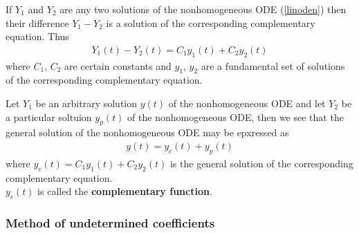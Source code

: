\documentclass{article}
\begin{document}
\begin{theorem}
	If $Y_1$ and $Y_2$ are any two solutions of the nonhomogeneous ODE
	(\ref{linoden}) then their difference $Y_1-Y_2$ is  a solution of the
	corresponding complementary equation. Thus
	\begin{align*}
		Y_1(t) - Y_2(t) = C_1y_1(t) + C_2y_2(t)
	\end{align*}
	where $C_1$, $C_2$ are certain constants and $y_1$, $y_2$ are a
	fundamental set of solutions of the corresponding complementary equation.
\end{theorem}

\begin{theorem}
	Let $Y_1$ be an arbitrary solution $y(t)$ of the nonhomogeneous ODE
	and let $Y_2$ be a particular soltuion $y_p(t)$ of the nonhomogeneous
	ODE, then we see that the general solution of the nonhomogeneous ODE
	may be epxressed as
	\begin{align*}
		y(t) = y_c(t) + y_p(t)
	\end{align*}
	where $y_c(t) = C_1y_1(t) + C_2y_2(t)$ is the general solution of the
	corresponding complementary equation.\\
	$y_c(t)$ is called the \textbf{complementary function}.
\end{theorem}

\subsubsection{Method of undetermined coefficients}
\end{document}
